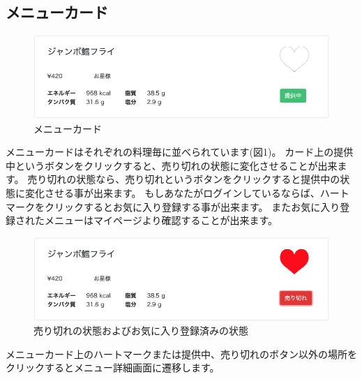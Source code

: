 \documentclass[a4paper]{ltjsarticle}
\begin{document}
\subsection{メニューカード}
    \begin{figure}[htbp]
    \centering
        \caption{メニューカード}
        \includegraphics[scale = 0.3]{image/menucard.png}
    \end{figure}

    メニューカードはそれぞれの料理毎に並べられています(図1)。
    カード上の提供中というボタンをクリックすると、売り切れの状態に変化させることが出来ます。
    売り切れの状態なら、売り切れというボタンをクリックすると提供中の状態に変化させる事が出来ます。
    もしあなたがログインしているならば、ハートマークをクリックするとお気に入り登録する事が出来ます。
    またお気に入り登録されたメニューはマイページより確認することが出来ます。

    \begin{figure}[htbp]
    \centering
        \caption{売り切れの状態およびお気に入り登録済みの状態}
        \includegraphics[scale = 0.3]{image/menucard2.png}
    \end{figure}
    メニューカード上のハートマークまたは提供中、売り切れのボタン以外の場所をクリックするとメニュー詳細画面に遷移します。
    \newpage
\end{document}
